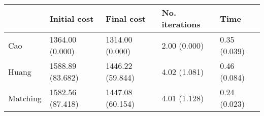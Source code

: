 \begin{tabular}{lllll}
\toprule
{} &      Initial cost &        Final cost & No. iterations &          Time \\
\midrule
Cao      &   1364.00 (0.000) &   1314.00 (0.000) &   2.00 (0.000) &  0.35 (0.039) \\
Huang    &  1588.89 (83.682) &  1446.22 (59.844) &   4.02 (1.081) &  0.46 (0.084) \\
Matching &  1582.56 (87.418) &  1447.08 (60.154) &   4.01 (1.128) &  0.24 (0.023) \\
\bottomrule
\end{tabular}
